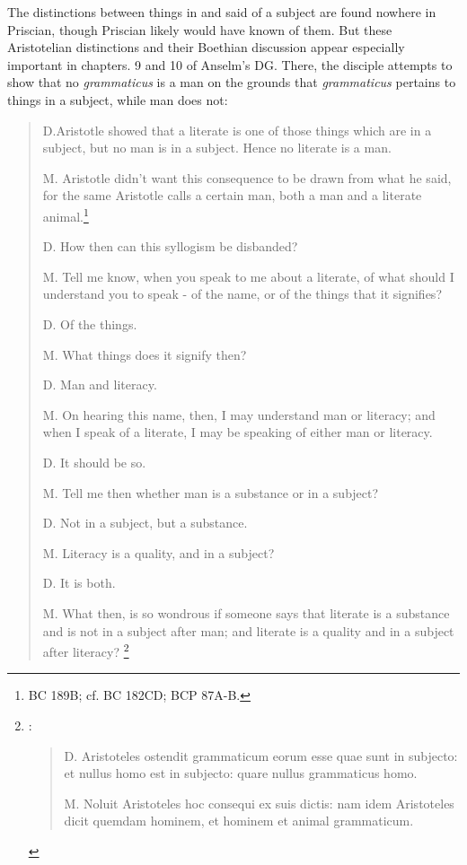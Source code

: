 \documentclass[]{article}
\begin{document}
The distinctions between things in and said of a subject are found nowhere in Priscian, though Priscian likely would have known of them. But these Aristotelian distinctions and their Boethian discussion appear especially important in chapters. 9 and 10 of Anselm's DG. There, the disciple attempts to show that no \textit{grammaticus} is a man on the grounds that \textit{grammaticus} pertains to things in a subject, while man does not: 

\begin{quote}
D.Aristotle showed that a literate is one of those things which are in a subject, but no man is in a subject. Hence no literate is a man. 

M. Aristotle didn't want this consequence to be drawn from what he said, for the same Aristotle calls a certain man, both a man and a literate animal.\footnote{BC 189B; cf. BC 182CD; BCP 87A-B.} 

D. How then can this syllogism be disbanded?

M. Tell me know, when you speak to me about a literate, of what should I understand you to speak - of the name, or of the things that it signifies?

D. Of the things.

M. What things does it signify then? 

D. Man and literacy.

M. On hearing this name, then, I may understand man or literacy; and when I speak of a literate, I may be speaking of either man or literacy.

D. It should be so.

M. Tell me then whether man is a substance or in a subject?

D. Not in a subject, but a substance.

M. Literacy is a quality, and in a subject?

D. It is both.

M. What then, is so wondrous if someone says that literate is a substance and is not in a subject after man; and literate is a quality and in a subject after literacy? \cite[pp. 61-62, alt.]{Henry1974}\footnote{\cite[DG 9]{Anselm1974}:
\begin{quote}
D. Aristoteles ostendit grammaticum eorum esse quae sunt in subjecto: et nullus homo est in subjecto: quare nullus grammaticus homo. 

M. Noluit Aristoteles hoc consequi ex suis dictis: nam idem Aristoteles dicit quemdam hominem, et hominem et animal grammaticum. 


\end{quote}}
\end{quote}
\end{document}
